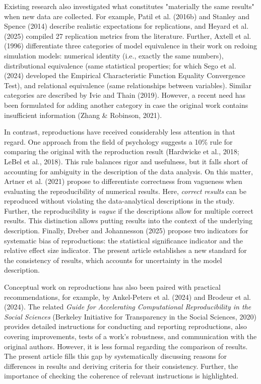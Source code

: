 \documentclass[authordate, meta]{jote-new-article}
\begin{document}
	Existing research also investigated what constitutes "materially the same results" when new data are collected. For example, Patil et al. (2016b) and Stanley and Spence (2014) describe realistic expectations for replications, and Heyard et al. (2025) compiled 27 replication metrics from the literature. Further, Axtell et al. (1996) differentiate three categories of model equivalence in their work on redoing simulation models: numerical identity (i.e., exactly the same numbers), distributional equivalence (same statistical properties; for which Sego et al. (2024) developed the Empirical Characteristic Function Equality Convergence Test), and relational equivalence (same relationships between variables). Similar categories are described by Ivie and Thain (2019). However, a recent need has been formulated for adding another category in case the original work contains insufficient information (Zhang \& Robinson, 2021).



	In contrast, reproductions have received considerably less attention in that regard. One approach from the field of psychology suggests a 10\% rule for comparing the original with the reproduction result (Hardwicke et al., 2018; LeBel et al., 2018). This rule balances rigor and usefulness, but it falls short of accounting for ambiguity in the description of the data analysis. On this matter, Artner et al. (2021) propose to differentiate correctness from vagueness when evaluating the reproducibility of numerical results. Here, \emph{correct results} can be reproduced without violating the data-analytical descriptions in the study. Further, the reproducibility is \emph{vague} if the descriptions allow for multiple correct results. This distinction allows putting results into the context of the underlying description. Finally, Dreber and Johannesson (2025) propose two indicators for systematic bias of reproductions: the statistical significance indicator and the relative effect size indicator. The present article establishes a new standard for the consistency of results, which accounts for uncertainty in the model description.



	Conceptual work on reproductions has also been paired with practical recommendations, for example, by Ankel-Peters et al. (2024) and Brodeur et al. (2024). The related \emph{Guide for Accelerating Computational Reproducibility in the Social Sciences} (Berkeley Initiative for Transparency in the Social Sciences, 2020) provides detailed instructions for conducting and reporting reproductions, also covering improvements, tests of a work's robustness, and communication with the original authors. However, it is less formal regarding the comparison of results. The present article fills this gap by systematically discussing reasons for differences in results and deriving criteria for their consistency. Further, the importance of checking the coherence of relevant instructions is highlighted.
\end{document}
